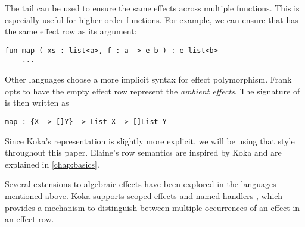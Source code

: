 The tail can be used to ensure the same effects across multiple functions. This is especially useful for higher-order functions. For example, we can ensure that  has the same effect row as its argument:
\begin{lstlisting}[language={},style=fancy]
fun map ( xs : list<a>, f : a -> e b ) : e list<b>
    ...
\end{lstlisting}

Other languages choose a more implicit syntax for effect polymorphism. Frank \autocite{lindley_be_2017} opts to have the empty effect row represent the \emph{ambient effects}. The signature of  is then written as
\begin{lstlisting}[language={},style=fancy]
map : {X -> []Y} -> List X -> []List Y
\end{lstlisting}
Since Koka's representation is slightly more explicit, we will be using that style throughout this paper. Elaine's row semantics are inspired by Koka and are explained in \cref{chap:basics}.

Several extensions to algebraic effects have been explored in the languages mentioned above. Koka supports scoped effects and named handlers \autocite{xie_first-class_2022}, which provides a mechanism to distinguish between multiple occurrences of an effect in an effect row.

